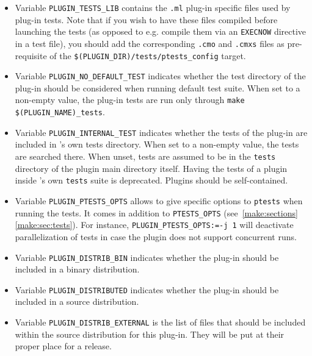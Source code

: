 \begin{itemize}
\item Variable
  \texttt{PLUGIN\_TESTS\_LIB}
  contains the \texttt{.ml} plug-in specific files used by plug-in
  tests. Note that if you wish to have these files
  compiled before launching the tests (as opposed to e.g. compile them via
  an \verb|EXECNOW| directive in a test file), you should add the 
  corresponding \verb|.cmo| and \verb|.cmxs| files as pre-requisite
  of the \verb|$(PLUGIN_DIR)/tests/ptests_config| %
  target.
\item Variable
  \texttt{PLUGIN\_NO\_DEFAULT\_TEST}%
   indicates
  whether the test directory of the plug-in should be considered when
  running \framac default test suite. When set to a non-empty value,
  the plug-in tests are run only through \texttt{make
    \$(PLUGIN\_NAME)\_tests}.
\item Variable
  \texttt{PLUGIN\_INTERNAL\_TEST}%
   indicates
  whether the tests of the plug-in are included in \framac's own tests
  directory. When set to a non-empty value, the tests are searched
  there. When unset, tests are assumed to be in the \texttt{tests}
  directory of the plugin main directory itself. Having the tests of a
  plugin inside \framac's own \texttt{tests} suite is
  deprecated. Plugins should be self-contained.
\item Variable
  \texttt{PLUGIN\_PTESTS\_OPTS}%
   allows to give specific options to
  \texttt{ptests} when running the tests. It comes in addition to
  \texttt{PTESTS\_OPTS} 
  (see~\ref{make:sections}\textsection\ref{make:sec:tests}). 
  For instance, 
  \verb|PLUGIN_PTESTS_OPTS:=-j 1| will deactivate parallelization of tests in case
  the plugin does not support concurrent runs.
%
\item Variable
\texttt{PLUGIN\_DISTRIB\_BIN}%
indicates whether the plug-in should be included in a binary distribution.%
\item Variable
\texttt{PLUGIN\_DISTRIBUTED}%
indicates whether the plug-in should be included in a source distribution.%
\item Variable
\texttt{PLUGIN\_DISTRIB\_EXTERNAL}%
is the list of files that should be included within the source
distribution for this plug-in. They will be put at their proper place for a
release.
\end{itemize}
